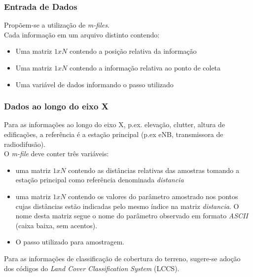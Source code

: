 \documentclass[11pt]{beamer}
\begin{document}
\begin{frame}
	\frametitle{Entrada de Dados}
	Propõem-se a utilização de \textit{m-files}.\\
	Cada informação em um arquivo distinto contendo:
	\begin{itemize}
		\item Uma matriz $1xN$ contendo a posição relativa da informação
		\item Uma matriz $1xN$ contendo a informação relativa ao ponto de coleta
		\item Uma variável de dados informando o passo utilizado
	\end{itemize}
\end{frame}

\begin{frame}
	\frametitle{Dados ao longo do eixo X}
	Para as informações ao longo do eixo X, p.ex. elevação, clutter, altura de edificações, a referência é a estação principal (p.ex eNB, transmissora de radiodifusão).\\
	O \textit{m-file} deve conter três variáveis: 
	\begin{itemize}
		\item uma matriz $1xN$ contendo as distâncias relativas das amostras tomando a estação principal como referência denominada \emph{distancia}
		\item uma matriz $1xN$ contendo os valores do parâmetro amostrado nos pontos cujas distâncias estão indicadas pelo mesmo índice na matriz \emph{distancia}. O nome desta matriz segue o nome do parâmetro observado em formato \textit{ASCII} (caixa baixa, sem acentos).
		\item O passo utilizado para amostragem.
	\end{itemize}
	Para as informações de classificação de cobertura do terreno, sugere-se adoção dos códigos do \textit{Land Cover Classification System} (LCCS).
\end{frame}
\end{document}
